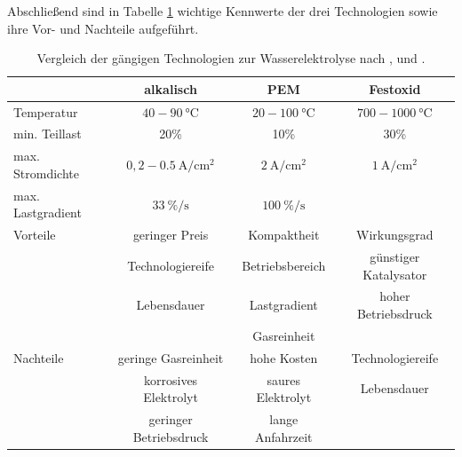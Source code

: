 Abschließend sind in Tabelle \ref{tb:VglElektrolyseur} wichtige Kennwerte der drei Technologien sowie ihre Vor- und Nachteile aufgeführt.

\begin{table}[ht]
		\centering
		\caption{Vergleich der gängigen Technologien zur Wasserelektrolyse nach \citet{milanzi_technischer_2018}, \citet{tremel_electrolysisfundamental_2018} und \citet{rashid_hydrogen_2015}.}
		\begin{tabular}{l c c c}
		\toprule
		 & alkalisch & PEM & Festoxid
		\\
		\midrule
		Temperatur & $40 - \SI{90}{\degreeCelsius}$ & $20 - \SI{100}{\degreeCelsius}$ & $700-\SI{1000}{\degreeCelsius}$\\
		min. Teillast & 20\% & 10\% & 30\% \\
		max. Stromdichte & $0,2 - \SI{0,5}{\A\per\cm\squared}$ & $\SI{2}{\A\per\cm\squared}$ & $\SI{1}{\A\per\cm\squared}$\\
		max. Lastgradient & $\SI{33}{\%\per\s}$ & $\SI{100}{\%\per\s}$ & \\
		\midrule
		Vorteile & geringer Preis & Kompaktheit & Wirkungsgrad\\
		& Technologiereife & Betriebsbereich & günstiger Katalysator\\
		& Lebensdauer & Lastgradient & hoher Betriebsdruck\\
		& & Gasreinheit&\\
		\midrule
		Nachteile & geringe Gasreinheit & hohe Kosten & Technologiereife\\
		& korrosives Elektrolyt & saures Elektrolyt & Lebensdauer\\
		& geringer Betriebsdruck & lange Anfahrzeit & \\
		\bottomrule
		\end{tabular}
		\label{tb:VglElektrolyseur}
\end{table}	


